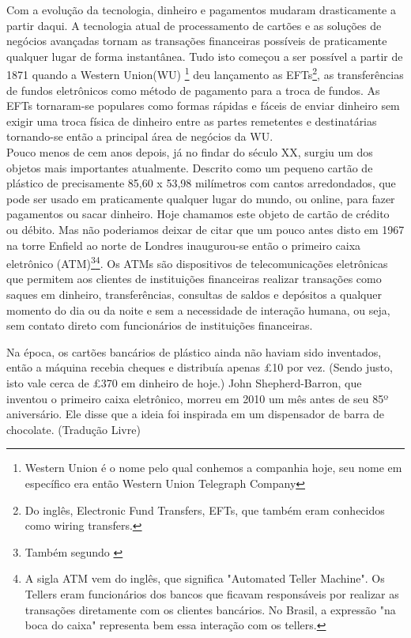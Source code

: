 Com a evolução da tecnologia, dinheiro e pagamentos mudaram drasticamente a partir daqui. A tecnologia atual de processamento de cartões e as soluções de negócios avançadas tornam as transações financeiras possíveis de praticamente qualquer lugar de forma instantânea.  Tudo isto começou a ser possível a partir de 1871 quando a Western Union(WU) \footnote{Western Union é o nome pelo qual conhemos a companhia hoje, seu nome em específico era então Western Union Telegraph Company} deu lançamento as EFTs\footnote{Do inglês, Electronic Fund Transfers, EFTs, que também eram conhecidos como wiring transfers.}, as transferências de fundos eletrônicos como método de pagamento para a troca de fundos. As EFTs tornaram-se populares como formas rápidas e fáceis de enviar dinheiro sem exigir uma troca física de dinheiro entre as partes remetentes e destinatárias tornando-se então a principal área de negócios da WU.\\
Pouco menos de cem anos depois, já no findar do século XX, surgiu  um dos objetos mais importantes atualmente. Descrito como um pequeno cartão de plástico de precisamente 85,60 x 53,98 milímetros com cantos arredondados, que pode ser usado em praticamente qualquer lugar do mundo, ou online, para fazer pagamentos ou sacar dinheiro. Hoje chamamos este objeto de cartão de crédito ou débito. 
Mas não poderiamos deixar de citar que um pouco antes disto em 1967 na torre Enfield ao norte de Londres inaugurou-se então o primeiro caixa eletrônico (ATM)\footnote{Também segundo \cite{QUARTZ}}\footnote{A sigla ATM vem do inglês, que significa "Automated Teller Machine". Os Tellers eram funcionários dos bancos que ficavam responsáveis por realizar as transações diretamente com os clientes bancários. No Brasil, a expressão "na boca do caixa" representa bem essa interação com os tellers.}. Os ATMs são dispositivos de telecomunicações eletrônicas que permitem aos clientes de instituições financeiras realizar transações como saques em dinheiro, transferências, consultas de saldos e depósitos a qualquer momento do dia ou da noite e sem a necessidade de interação humana, ou seja, sem contato direto com funcionários de instituições financeiras.

\begin{citacao}
	Na época, os cartões bancários de plástico ainda não haviam sido inventados, então a máquina recebia cheques e distribuía apenas \pounds10 por vez. (Sendo justo, isto vale cerca de \pounds370 em dinheiro de hoje.) John Shepherd-Barron, que inventou o primeiro caixa eletrônico, morreu em 2010 um mês antes de seu 85º aniversário. Ele disse que a ideia foi inspirada em um dispensador de barra de chocolate. (Tradução Livre) \cite{QUARTZ}
\end{citacao}

